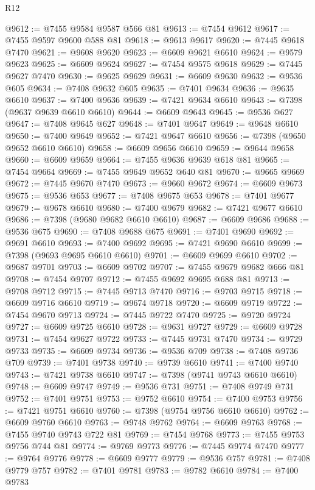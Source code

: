 \begin{lexlean}{R12}
\begin{coremodule}
@9612 := @7455 @9584 @9587 @566 @81
@9613 := @7454 @9612
@9617 := @7455 @9597 @9600 @588 @81
@9618 := @9613 @9617
@9620 := @7445 @9618 @7470
@9621 := @9608 @9620
@9623 := @6609 @9621 @6610
@9624 := @9579 @9623
@9625 := @6609 @9624
@9627 := @7454 @9575 @9618
@9629 := @7445 @9627 @7470
@9630 := @9625 @9629
@9631 := @6609 @9630
@9632 := @9536 @605
@9634 := @7408 @9632 @605
@9635 := @7401 @9634
@9636 := @9635 @6610
@9637 := @7400 @9636
@9639 := @7421 @9634 @6610
@9643 := @7398 (@9637 @9639 @6610 @6610)
@9644 := @6609 @9643
@9645 := @9536 @627
@9647 := @7408 @9645 @627
@9648 := @7401 @9647
@9649 := @9648 @6610
@9650 := @7400 @9649
@9652 := @7421 @9647 @6610
@9656 := @7398 (@9650 @9652 @6610 @6610)
@9658 := @6609 @9656 @6610
@9659 := @9644 @9658
@9660 := @6609 @9659
@9664 := @7455 @9636 @9639 @618 @81
@9665 := @7454 @9664
@9669 := @7455 @9649 @9652 @640 @81
@9670 := @9665 @9669
@9672 := @7445 @9670 @7470
@9673 := @9660 @9672
@9674 := @6609 @9673
@9675 := @9536 @653
@9677 := @7408 @9675 @653
@9678 := @7401 @9677
@9679 := @9678 @6610
@9680 := @7400 @9679
@9682 := @7421 @9677 @6610
@9686 := @7398 (@9680 @9682 @6610 @6610)
@9687 := @6609 @9686
@9688 := @9536 @675
@9690 := @7408 @9688 @675
@9691 := @7401 @9690
@9692 := @9691 @6610
@9693 := @7400 @9692
@9695 := @7421 @9690 @6610
@9699 := @7398 (@9693 @9695 @6610 @6610)
@9701 := @6609 @9699 @6610
@9702 := @9687 @9701
@9703 := @6609 @9702
@9707 := @7455 @9679 @9682 @666 @81
@9708 := @7454 @9707
@9712 := @7455 @9692 @9695 @688 @81
@9713 := @9708 @9712
@9715 := @7445 @9713 @7470
@9716 := @9703 @9715
@9718 := @6609 @9716 @6610
@9719 := @9674 @9718
@9720 := @6609 @9719
@9722 := @7454 @9670 @9713
@9724 := @7445 @9722 @7470
@9725 := @9720 @9724
@9727 := @6609 @9725 @6610
@9728 := @9631 @9727
@9729 := @6609 @9728
@9731 := @7454 @9627 @9722
@9733 := @7445 @9731 @7470
@9734 := @9729 @9733
@9735 := @6609 @9734
@9736 := @9536 @709
@9738 := @7408 @9736 @709
@9739 := @7401 @9738
@9740 := @9739 @6610
@9741 := @7400 @9740
@9743 := @7421 @9738 @6610
@9747 := @7398 (@9741 @9743 @6610 @6610)
@9748 := @6609 @9747
@9749 := @9536 @731
@9751 := @7408 @9749 @731
@9752 := @7401 @9751
@9753 := @9752 @6610
@9754 := @7400 @9753
@9756 := @7421 @9751 @6610
@9760 := @7398 (@9754 @9756 @6610 @6610)
@9762 := @6609 @9760 @6610
@9763 := @9748 @9762
@9764 := @6609 @9763
@9768 := @7455 @9740 @9743 @722 @81
@9769 := @7454 @9768
@9773 := @7455 @9753 @9756 @744 @81
@9774 := @9769 @9773
@9776 := @7445 @9774 @7470
@9777 := @9764 @9776
@9778 := @6609 @9777
@9779 := @9536 @757
@9781 := @7408 @9779 @757
@9782 := @7401 @9781
@9783 := @9782 @6610
@9784 := @7400 @9783

\end{coremodule}
\end{lexlean}
